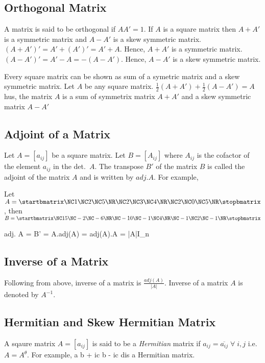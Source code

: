 \subsection{Orthogonal Matrix}
A matrix is said to be orthogonal if $AA'=1$.
\starttheorem
  If $A$ is a square matrix then $A + A'$ is a symmetric matrix and $A-A'$ is a skew symmetric matrix.
\stoptheorem
\startproof
  $(A + A')' = A' + (A')' = A' + A$. Hence, $A + A'$ is a symmetric matrix. $(A - A')' = A' - A = -(A - A')$. Hence, $A- A'$ is a
  skew symmetric matrix.
\stopproof

\starttheorem
  Every square matrix can be shown as sum of a symetric matrix and a skew   symmetric matrix.
\stoptheorem
\startproof
  Let $A$ be any square matrix. $\frac{1}{2}(A + A') + \frac{1}{2}(A - A') = A$ hus, the matrix $A$ is a sum of symmetrix matrix $A
  + A'$ and a skew symmetric matrix $A - A'$
\stopproof

\subsection{Adjoint of a Matrix}
Let $A= [a_{ij}]$ be a square matrix. Let $B = [A_{ij}]$ where $A_{ij}$ is the cofactor of the element $a_{ij}$ in the
det.\ $A$. The transpose $B'$ of the matrix $B$ is called the adjoint of the matrix $A$ and is written by $adj. A$. For example,

Let $A = \startbmatrix\NC 1 \NC 2\NC 5\NR\NC2 \NC 3 \NC 4\NR\NC2\NC 0 \NC 5\NR\stopbmatrix $, then
$B = \startbmatrix\NC 15 \NC -2 \NC -6\NR\NC-10 \NC -1 \NC 4\NR\NC-1 \NC 2 \NC -1\NR\stopbmatrix $

\startformula adj. A = B' = \startbmatrix{} \NR{}  \NR{}  \NR\stopbmatrix \stopformula
\startformula A.adj(A) = adj(A).A = |A|I_n\stopformula

\subsection{Inverse of a Matrix}
Following from above, inverse of a matrix is $\frac{adj(A)}{|A|}$. Inverse of a matrix $A$ is denoted by $A^{-1}$.

\subsection{Hermitian and Skew Hermitian Matrix}
A sqaure matrix $A = [a_{ij}]$ is said to be a {\it Hermitian} matrix if $a_{ij} = \overline{a_{ij}}\;\forall\;i, j$ i.e. $A =
A^{\theta}$. For example,
\startformula \startbmatrix\NC a \NC b + ic \NR\NC b - ic \NC d\NR\stopbmatrix \stopformula is a Hermitian
matrix.


